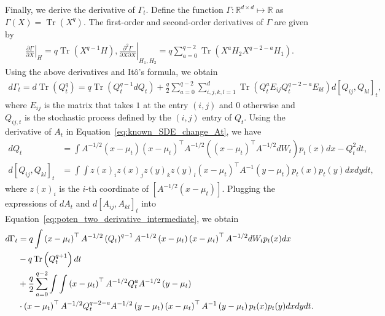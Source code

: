 \documentclass[11pt,twoside]{article}
\newcommand{\co}{A}
\newcommand{\qo}{Q}
\newcommand{\potentwo}{\Gamma}
\theoremstyle{named}
\theoremstyle{plain}
\newcommand{\usedim}{\ensuremath{d}}
\newcommand{\dims}{\usedim}
\DeclareMathOperator{\trace}{Tr}
\newcommand{\real}{\ensuremath{\mathbb{R}}}
\newcommand{\brackets}[1]{\left[ #1 \right]}
\newcommand{\parenth}[1]{\left( #1 \right)}
\newcommand{\tp}{^\top}
\begin{document}
Finally, we derive the derivative of $\potentwo_t$. Define the function $\Gamma: \real^{\dims \times \dims} \mapsto \real$ as $\Gamma(X) = \trace\parenth{X^q}$. The first-order and second-order derivatives of $\Gamma$ are given by
\begin{align*}
  \left.\frac{\partial \Gamma}{\partial X}\right|_{H} = q \trace\parenth{ X^{q-1} H}, \left.\frac{\partial^2 \Gamma}{\partial X \partial X}\right|_{H_1, H_2} = q \sum_{a=0}^{q-2} \trace\parenth{X^a H_2 X^{q-2-a} H_1}.
\end{align*}
Using the above derivatives and It\^o's formula, we obtain
\begin{align}
  \label{eq:poten_two_derivative_intermediate}
  d\potentwo_t = d \trace\parenth{\qo_t^q} = q \trace\parenth{ \qo_t^{q-1} d \qo_t} + \frac{q}{2} \sum_{a = 0}^{q-2} \sum_{i,j,k,l=1}^{\dims} \trace\parenth{\qo_t^a E_{ij} \qo_t^{q-2-a} E_{kl}} d\brackets{Q_{ij}, Q_{kl}}_t,
\end{align}
where $E_{ij}$ is the matrix that takes $1$ at the entry $(i, j)$ and $0$ otherwise and $Q_{ij, t}$ is the stochastic process defined by the $(i,j)$ entry of $Q_t$.
Using the derivative of $A_t$ in Equation~\eqref{eq:known_SDE_change_At}, we have
\begin{align*}
  d\qo_t &= \int  \co^{-1/2} \parenth{x - \mu_t} \parenth{x - \mu_t}\tp \co^{-1/2} \parenth{\parenth{x-\mu_t}\tp \co^{-1/2} dW_t} p_t(x) dx - \qo_t^2 dt, \\
  d\brackets{\qo_{ij}, \qo_{kl}}_t &= \int \int z(x)_i z(x)_j z(y)_k z(y)_l (x-\mu_t)\tp \co^{-1} (y-\mu_t) p_t(x) p_t(y)dx dy dt,
\end{align*}
where $z(x)_i$ is the $i$-th coordinate of $\brackets{\co^{-1/2}(x-\mu_t)}$.
Plugging the expressions of $dA_t$ and $d\brackets{A_{ij}, A_{kl}}_t $ into Equation~\eqref{eq:poten_two_derivative_intermediate}, we obtain
\begin{align*}
  d\potentwo_t &=  q \int \parenth{x-\mu_t}\tp \co^{-1/2} \parenth{\qo_t}^{q-1} \co^{-1/2} \parenth{x-\mu_t} \parenth{x-\mu_t}\tp \co^{-1/2} dW_t p_t(x) dx \notag \\
  &- q \trace\parenth{\qo_t^{q+1} } dt \notag \\
  &+ \frac{q}{2} \sum_{a = 0}^{q-2} \int \int \parenth{x-\mu_t}\tp \co^{-1/2} \qo_t^{a} \co^{-1/2} \parenth{y-\mu_t} \notag \\
  &\cdot \parenth{x-\mu_t}\tp \co^{-1/2} \qo_t^{q-2-a} \co^{-1/2} \parenth{y-\mu_t} \parenth{x-\mu_t}\tp \co^{-1} \parenth{y-\mu_t} p_t(x) p_t(y) dx dy dt.
\end{align*}









\end{document}
